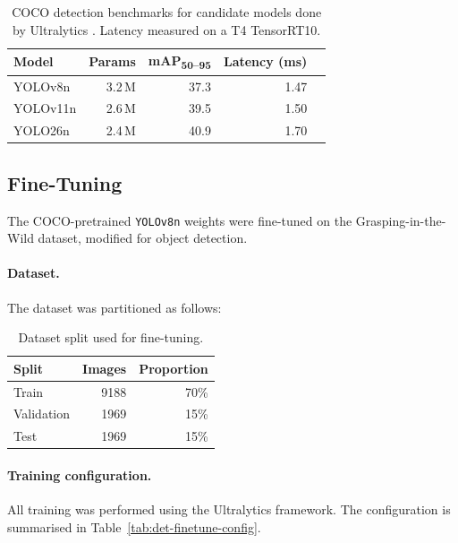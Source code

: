 \documentclass{article}
\begin{document}
\begin{table}[H]
\centering
\begin{tabular}{lrrrr}
\toprule
\textbf{Model} & \textbf{Params} & 
\textbf{mAP\textsubscript{50--95}} & \textbf{Latency (ms)} \\
\midrule
YOLOv8n  & 3.2\,M  & 37.3 & 1.47 \\
YOLOv11n  & 2.6\,M  & 39.5 & 1.50 \\
YOLO26n  & 2.4\,M  & 40.9 & 1.70 \\
\bottomrule
\end{tabular}
\caption{COCO detection benchmarks for candidate models done by Ultralytics \cite{ultralytics_yolov8_metrics}.
Latency measured on a T4 TensorRT10.}
\label{tab:det-model-comparison}
\end{table}

\subsection{Fine-Tuning}
\label{sec:det-finetuning}

The COCO-pretrained \texttt{YOLOv8n} weights were fine-tuned on the Grasping-in-the-Wild dataset, modified for object detection.

\paragraph{Dataset.}
The dataset was partitioned as follows:

\begin{table}[H]
\centering
\caption{Dataset split used for fine-tuning.}
\label{tab:det-dataset-split}
\begin{tabular}{lrr}
\toprule
\textbf{Split} & \textbf{Images} & \textbf{Proportion} \\
\midrule
Train      & 9188 & 70\% \\
Validation & 1969 & 15\% \\
Test       & 1969 & 15\% \\
\bottomrule
\end{tabular}
\end{table}

\paragraph{Training configuration.}
All training was performed using the Ultralytics framework. The configuration is
summarised in Table~\ref{tab:det-finetune-config}.
\end{document}
